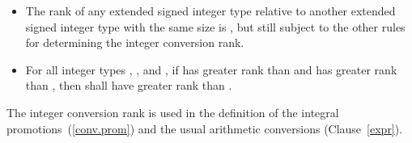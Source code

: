 \begin{itemize}
\item The rank of any extended signed integer type relative to another
extended signed integer type with the same size is , but still subject to the other rules for determining the integer
conversion rank.

\item For all integer types , , and , if
 has greater rank than  and  has greater
rank than , then  shall have greater rank than
.
\end{itemize}

\enternote
The integer conversion rank is used in the definition of the integral
promotions~(\ref{conv.prom}) and the usual arithmetic
conversions (Clause~\ref{expr}).
\exitnote%
